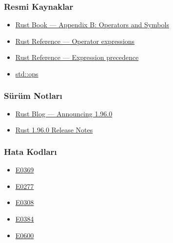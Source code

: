 \documentclass[12pt,a4paper]{article}
\begin{document}
\subsubsection{Resmi Kaynaklar}\label{resmi-kaynaklar-4}

\begin{itemize}
\tightlist
\item
  \href{https://doc.rust-lang.org/book/appendix-02-operators.html}{Rust Book --- Appendix B: Operators and Symbols}
\item
  \href{https://doc.rust-lang.org/reference/expressions/operator-expr.html}{Rust Reference --- Operator expressions}
\item
  \href{https://doc.rust-lang.org/reference/expressions.html\#expression-precedence}{Rust Reference --- Expression precedence}
\item
  \href{https://doc.rust-lang.org/std/ops/index.html}{std::ops}
\end{itemize}

\subsubsection{Sürüm Notları}\label{sürüm-notları-4}

\begin{itemize}
\tightlist
\item
  \href{https://blog.rust-lang.org/2026/05/28/Rust-1.96.0/}{Rust Blog --- Announcing 1.96.0}
\item
  \href{https://doc.rust-lang.org/stable/releases.html\#version-1960-2026-05-28}{Rust 1.96.0 Release Notes}
\end{itemize}

\subsubsection{Hata Kodları}\label{hata-kodları-4}

\begin{itemize}
\tightlist
\item
  \href{https://doc.rust-lang.org/error_codes/E0369.html}{E0369}
\item
  \href{https://doc.rust-lang.org/error_codes/E0277.html}{E0277}
\item
  \href{https://doc.rust-lang.org/error_codes/E0308.html}{E0308}
\item
  \href{https://doc.rust-lang.org/error_codes/E0384.html}{E0384}
\item
  \href{https://doc.rust-lang.org/error_codes/E0600.html}{E0600}
\end{itemize}
\end{document}
